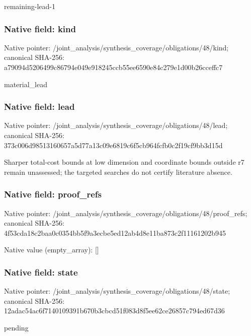 \documentclass[10pt,a4paper]{article}
\begin{document}
\begingroup\raggedright\sloppy remaining-lead-1\par\endgroup

\subsubsection{Native field: kind}
Native pointer: /joint\_\allowbreak{}analysis/synthesis\_\allowbreak{}coverage/obligations/48/kind; canonical SHA-256: a79094d5206499c86794e049e918245ccb55ee6590e84c279e1d00b26cceffc7

\begingroup\raggedright\sloppy material\_\allowbreak{}lead\par\endgroup

\subsubsection{Native field: lead}
Native pointer: /joint\_\allowbreak{}analysis/synthesis\_\allowbreak{}coverage/obligations/48/lead; canonical SHA-256: 373c006d98513160657a5d77a13c09e6819c6f5cb964fcfb0c2f19cf9bb3d15d

\begingroup\raggedright\sloppy Sharper total-cost bounds at low dimension and coordinate bounds outside r7 remain unassessed;\allowbreak{} the targeted searches do not certify literature absence.\par\endgroup

\subsubsection{Native field: proof\_\allowbreak{}refs}
Native pointer: /joint\_\allowbreak{}analysis/synthesis\_\allowbreak{}coverage/obligations/48/proof\_\allowbreak{}refs; canonical SHA-256: 4f53cda18c2baa0c0354bb5f9a3ecbe5ed12ab4d8e11ba873c2f11161202b945

Native value (empty\_\allowbreak{}array): []

\subsubsection{Native field: state}
Native pointer: /joint\_\allowbreak{}analysis/synthesis\_\allowbreak{}coverage/obligations/48/state; canonical SHA-256: 12adac54ac6f7140109391b670b3cbcd51f083d8f5ee62ce26857c794ed67d36

\begingroup\raggedright\sloppy pending\par\endgroup
\end{document}
